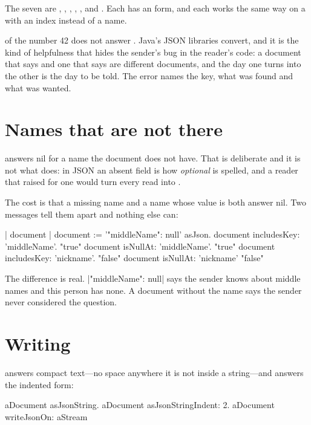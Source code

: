 The seven are , , , ,
,  and . Each has an
 form, and each works the same way on a  with an
index instead of a name.

\begin{stnote}
 of the number 42 does not answer . Java's JSON
libraries convert, and it is the kind of helpfulness that hides the sender's
bug in the reader's code: a document that says  and one that says
 are different documents, and the day one turns into the other is
the day to be told. The error names the key, what was found and what was
wanted.
\end{stnote}

\section{Names that are not there}

 answers nil for a name the document does not have. That is
deliberate and it is not what  does: in JSON an absent field is
how \emph{optional} is spelled, and a reader that raised for one would turn
every read into .

The cost is that a missing name and a name whose value is  both
answer nil. Two messages tell them apart and nothing else can:

\begin{st}
| document |
document := '{"middleName": null}' asJson.
document includesKey: 'middleName'.     "true"
document isNullAt: 'middleName'.        "true"
document includesKey: 'nickname'.       "false"
document isNullAt: 'nickname'           "false"
\end{st}

The difference is real. \ct|{"middleName": null}| says the sender knows about
middle names and this person has none. A document without the name says the
sender never considered the question.

\section{Writing}

 answers compact text---no space anywhere it is not inside a
string---and  answers the indented form:

\begin{st}
aDocument asJsonString.
aDocument asJsonStringIndent: 2.
aDocument writeJsonOn: aStream
\end{st}

